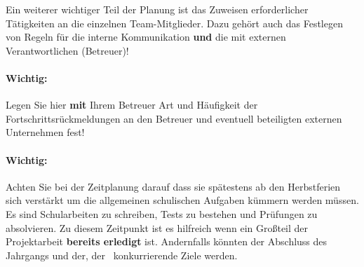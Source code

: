 Ein weiterer wichtiger Teil der Planung ist das Zuweisen erforderlicher Tätigkeiten an die einzelnen Team-Mitglieder.
Dazu gehört auch das Festlegen von Regeln für die interne Kommunikation \textbf{und} die mit externen Verantwortlichen (Betreuer)!\\

\paragraph{Wichtig:} Legen Sie hier \textbf{mit} Ihrem Betreuer Art und Häufigkeit der Fortschrittsrückmeldungen an den Betreuer und eventuell beteiligten externen Unternehmen fest!
\paragraph{Wichtig:} Achten Sie bei der Zeitplanung darauf dass sie spätestens ab den Herbstferien sich verstärkt um die allgemeinen schulischen Aufgaben kümmern werden müssen.
Es sind Schularbeiten zu schreiben, Tests zu bestehen und Prüfungen zu absolvieren. Zu diesem Zeitpunkt ist es hilfreich wenn ein Großteil der Projektarbeit \textbf{bereits erledigt} ist.
Andernfalls könnten der Abschluss des Jahrgangs und der, der \typeOfWork ~konkurrierende Ziele werden.